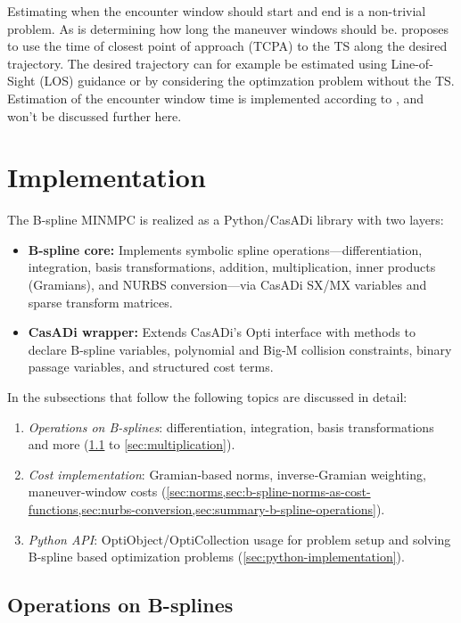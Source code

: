 Estimating when the encounter window should start and end is a non-trivial problem. As is determining how long the maneuver windows should be. \cite{Thyri2022-MPC} proposes to use the time of closest point of approach (TCPA) to the TS along the desired trajectory. The desired trajectory can for example be estimated using Line-of-Sight (LOS) guidance \citep{Fossen2011-Handbook} or by considering the optimzation problem without the TS. Estimation of the encounter window time is implemented according to \cite{Thyri2022-MPC}, and won't be discussed further here.


\section{Implementation}\label{sec:implementation}


The B-spline MINMPC is realized as a Python/CasADi library with two layers:

\begin{itemize}
  \item \textbf{B-spline core:}  
    Implements symbolic spline operations—differentiation, integration, basis transformations, addition, multiplication, inner products (Gramians), and NURBS conversion—via CasADi SX/MX variables and sparse transform matrices.
  \item \textbf{CasADi wrapper:}  
    Extends CasADi’s Opti interface with methods to declare B-spline variables, polynomial and Big-M collision constraints, binary passage variables, and structured cost terms.
\end{itemize}

In the subsections that follow the following topics are discussed in detail:
\begin{enumerate}
  \item \emph{Operations on B-splines}: differentiation, integration, basis transformations and more (\cref{sec:operations-on-b-splines} to \cref{sec:multiplication}).
  \item \emph{Cost implementation}: Gramian‐based norms, inverse‐Gramian weighting, maneuver-window costs (\cref{sec:norms,sec:b-spline-norms-as-cost-functions,sec:nurbs-conversion,sec:summary-b-spline-operations}).
  \item \emph{Python API}: OptiObject/OptiCollection usage for problem setup and solving B-spline based optimization problems (\cref{sec:python-implementation}).
\end{enumerate}

\subsection{Operations on B-splines}\label{sec:operations-on-b-splines}

